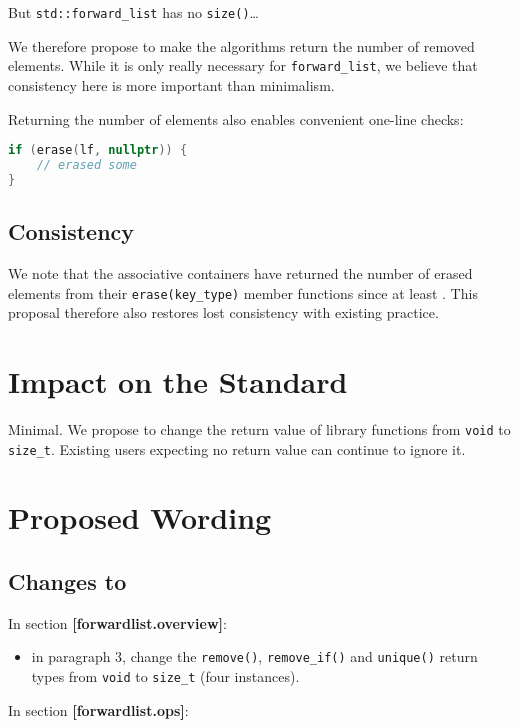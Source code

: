 \documentclass[11pt]{article}
\begin{document}
But \texttt{std::forward\_list} has no \texttt{size()}\ldots

We therefore propose to make the algorithms return the number of
removed elements. While it is only really necessary for
\texttt{forward\_list}, we believe that consistency here is more
important than minimalism.

Returning the number of elements also enables convenient one-line
checks:
\begin{lstlisting}[language=C++]
if (erase(lf, nullptr)) {
    // erased some
}
\end{lstlisting}

\subsection{Consistency}

We note that the associative containers have returned the number of
erased elements from their \texttt{erase(key\_type)} member functions
since at least \cite{STL}. This proposal therefore also restores
lost consistency with existing practice.

\section{Impact on the Standard}

Minimal. We propose to change the return value of library functions
from \texttt{void} to \texttt{size\_t}. Existing users expecting no
return value can continue to ignore it.

\section{Proposed Wording}

\subsection{Changes to \cite{cpp17}}

In section \textbf{[forwardlist.overview]}:

\begin{itemize}
\item in paragraph 3, change the \texttt{remove()},
  \texttt{remove\_if()} and \texttt{unique()} return types from
  \texttt{void} to \texttt{size\_t} (four instances).
\end{itemize}

In section \textbf{[forwardlist.ops]}:
\end{document}

